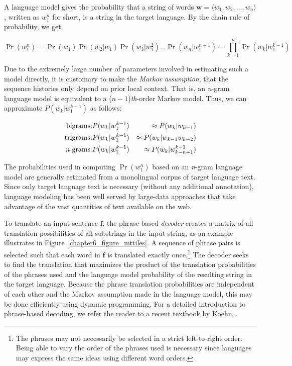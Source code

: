 A language model gives the probability that a string of words
$\textbf{w} = \langle w_1, w_2, \ldots , w_{n} \rangle$, written as
$w_{1}^{n}$ for short, is a string in the target language.  By the
chain rule of probability, we get:

\begin{equation}
\Pr(w_{1}^{n}) = \Pr(w_1) \Pr(w_2|w_1) \Pr(w_3|w_1^2) \ldots \Pr(w_n|w_1^{n-1}) = \prod_{k=1}^{n} \Pr(w_k|w_1^{k-1})
\end{equation}

\noindent Due to the extremely large number of parameters involved in
estimating such a model directly, it is customary to make the \emph{
  Markov assumption}, that the sequence histories only depend on prior
local context.  That is, an \emph{n}-gram language model is equivalent
to a ($n-1$)\emph{th}-order Markov model.  Thus, we can approximate
$P(w_k|w_1^{k-1})$ as follows:

\begin{eqnarray}
\textrm{bigrams:} & P(w_k|w_1^{k-1}) & \approx P(w_k|w_{k-1}) \\
\textrm{trigrams:} & P(w_k|w_1^{k-1}) & \approx P(w_k|w_{k-1} w_{k-2}) \\
\textrm{\emph{n}-grams:} & P(w_k|w_1^{k-1}) & \approx  P(w_k|w_{k-n+1}^{k-1})
\end{eqnarray}

\noindent The probabilities used in computing $\Pr(w_{1}^{n})$ based
on an \emph{n}-gram language model are generally estimated from a
monolingual corpus of target language text.  Since only target
language text is necessary (without any additional annotation),
language modeling has been well served by large-data approaches that
take advantage of the vast quantities of text available on the web.

To translate an input sentence $\textbf{f}$, the phrase-based
\emph{decoder} creates a matrix of all translation possibilities of
all substrings in the input string, as an example illustrates in
Figure~\ref{chapter6_figure_mttiles}.  A sequence of phrase pairs is
selected such that each word in $\textbf{f}$ is translated exactly
once.\footnote{The phrases may not necessarily be selected in a strict
  left-to-right order.  Being able to vary the order of the phrases
  used is necessary since languages may express the same ideas using
  different word orders.}  The decoder seeks to find the translation
that maximizes the product of the translation probabilities of the
phrases used and the language model probability of the resulting
string in the target language.  Because the phrase translation
probabilities are independent of each other and the Markov assumption
made in the language model, this may be done efficiently using dynamic
programming.  For a detailed introduction to phrase-based decoding, we
refer the reader to a recent textbook by Koehn~\cite{Koehn_2009}.

